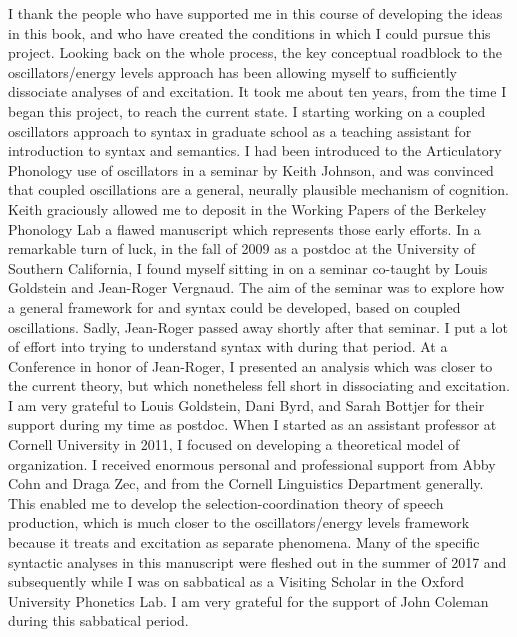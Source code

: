 \addchap{\lsAcknowledgementTitle} 

 \largerpage

I thank the people who have supported me in this course of developing the ideas in this book, and who have created the conditions in which I could pursue this project. Looking back on the whole process, the key conceptual roadblock to the oscillators/energy levels approach has been allowing myself to sufficiently dissociate analyses of  and excitation. It took me about ten years, from the time I began this project, to reach the current state. I starting working on a coupled oscillators approach to syntax in graduate school as a teaching assistant for introduction to syntax and semantics. I had been introduced to the Articulatory Phonology use of oscillators in a seminar by Keith Johnson, and was convinced that coupled oscillations are a general, neurally plausible mechanism of cognition. Keith graciously allowed me to deposit in the Working Papers of the Berkeley Phonology Lab a flawed manuscript which represents those early efforts. In a remarkable turn of luck, in the fall of 2009 as a postdoc at the University of Southern California, I found myself sitting in on a seminar co-taught by Louis Goldstein and Jean-Roger Vergnaud. The aim of the seminar was to explore how a general framework for  and syntax could be developed, based on coupled oscillations. Sadly, Jean-Roger passed away shortly after that seminar. I put a lot of effort into trying to understand syntax with  during that period. At a Conference in honor of Jean-Roger, I presented an analysis which was closer to the current theory, but which nonetheless fell short in dissociating  and excitation. I am very grateful to Louis Goldstein, Dani Byrd, and Sarah Bottjer for their support during my time as postdoc. When I started as an assistant professor at Cornell University in 2011, I focused on developing a theoretical model of  organization. I received enormous personal and professional support from Abby Cohn and Draga Zec, and from the Cornell Linguistics Department generally. This enabled me to develop the selection-coordination theory of speech production, which is much closer to the oscillators/energy levels framework because it treats  and excitation as separate phenomena. Many of the specific syntactic analyses in this manuscript were fleshed out in the summer of 2017 and subsequently while I was on sabbatical as a Visiting Scholar in the Oxford University Phonetics Lab. I am very grateful for the support of John Coleman during this sabbatical period.


